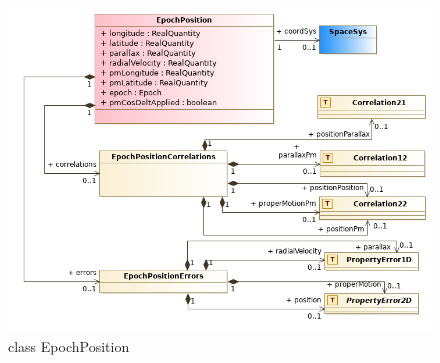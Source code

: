 \documentclass[11pt,a4paper]{ivoa}
\begin{document}
\begin{figure}
  \includegraphics[width=1.0\textwidth]{../model/epoch_position.png}
  \caption{class EpochPosition}
  \label{fig:epochPosition}
\end{figure}
\end{document}
